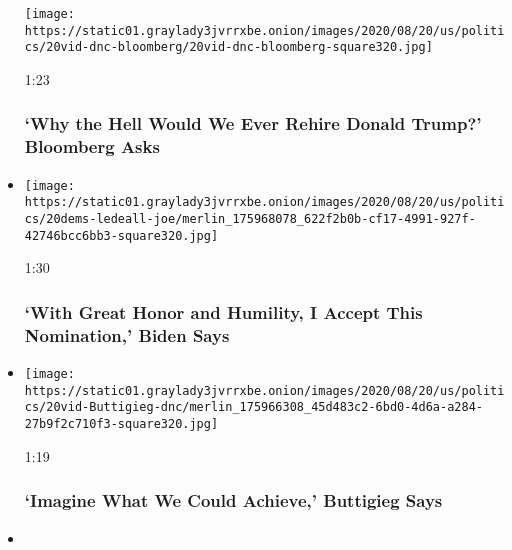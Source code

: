 \begin{itemize}
  \texttt{[image: https://static01.graylady3jvrrxbe.onion/images/2020/08/20/us/politics/20vid-dnc-bloomberg/20vid-dnc-bloomberg-square320.jpg]}

  1:23

  \hypertarget{why-the-hell-would-we-ever-rehire-donald-trump-bloomberg-asks}{%
  \subsubsection{`Why the Hell Would We Ever Rehire Donald Trump?'
  Bloomberg
  Asks}\label{why-the-hell-would-we-ever-rehire-donald-trump-bloomberg-asks}}
\item
  \href{https://www.nytimes3xbfgragh.onion/video/us/elections/100000007299760/joe-biden-speaks-dnc.html?action=click\&module=video-series-bar\&region=header\&pgtype=Article\&playlistId=video/2020-Elections}{}

  \texttt{[image: https://static01.graylady3jvrrxbe.onion/images/2020/08/20/us/politics/20dems-ledeall-joe/merlin\_175968078\_622f2b0b-cf17-4991-927f-42746bcc6bb3-square320.jpg]}

  1:30

  \hypertarget{with-great-honor-and-humility-i-accept-this-nomination-biden-says}{%
  \subsubsection{`With Great Honor and Humility, I Accept This
  Nomination,' Biden
  Says}\label{with-great-honor-and-humility-i-accept-this-nomination-biden-says}}
\item
  \href{https://www.nytimes3xbfgragh.onion/video/us/elections/100000007299812/pete-buttigieg-speaks-dnc.html?action=click\&module=video-series-bar\&region=header\&pgtype=Article\&playlistId=video/2020-Elections}{}

  \texttt{[image: https://static01.graylady3jvrrxbe.onion/images/2020/08/20/us/politics/20vid-Buttigieg-dnc/merlin\_175966308\_45d483c2-6bd0-4d6a-a284-27b9f2c710f3-square320.jpg]}

  1:19

  \hypertarget{imagine-what-we-could-achieve-buttigieg-says}{%
  \subsubsection{`Imagine What We Could Achieve,' Buttigieg
  Says}\label{imagine-what-we-could-achieve-buttigieg-says}}
\item
  \href{https://www.nytimes3xbfgragh.onion/video/us/elections/100000007299914/2020-candidates-endorse-biden-dnc.html?action=click\&module=video-series-bar\&region=header\&pgtype=Article\&playlistId=video/2020-Elections}{}


\end{itemize}

